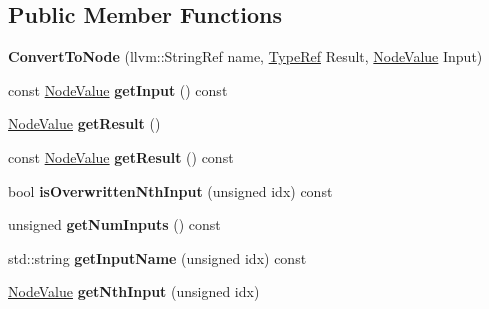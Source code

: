 \subsection*{Public Member Functions}
\begin{DoxyCompactItemize}
\item 
\mbox{\label{classglow_1_1_convert_to_node_a64149289fdfae59e8509afcecfbeafa6}} 
{\bfseries Convert\+To\+Node} (llvm\+::\+String\+Ref name, \hyperlink{structglow_1_1_type}{Type\+Ref} Result, \hyperlink{structglow_1_1_node_value}{Node\+Value} Input)
\item 
\mbox{\label{classglow_1_1_convert_to_node_a2052aec7043a840a1539697730d9e506}} 
const \hyperlink{structglow_1_1_node_value}{Node\+Value} {\bfseries get\+Input} () const
\item 
\mbox{\label{classglow_1_1_convert_to_node_aa44afaef4038dcfaf4f9dbc24b743ba8}} 
\hyperlink{structglow_1_1_node_value}{Node\+Value} {\bfseries get\+Result} ()
\item 
\mbox{\label{classglow_1_1_convert_to_node_aa1a10c07da1625f83ff7b3f1c1c23784}} 
const \hyperlink{structglow_1_1_node_value}{Node\+Value} {\bfseries get\+Result} () const
\item 
\mbox{\label{classglow_1_1_convert_to_node_abd5b138f50837a98913927ce60e65565}} 
bool {\bfseries is\+Overwritten\+Nth\+Input} (unsigned idx) const
\item 
\mbox{\label{classglow_1_1_convert_to_node_a3b2717b4a9d8b566a6c334a615dc047f}} 
unsigned {\bfseries get\+Num\+Inputs} () const
\item 
\mbox{\label{classglow_1_1_convert_to_node_a37973cf3efa7c514bd4a37782a6c70f7}} 
std\+::string {\bfseries get\+Input\+Name} (unsigned idx) const
\item 
\mbox{\label{classglow_1_1_convert_to_node_aa2ea850326fefda8681767144f0b7832}} 
\hyperlink{structglow_1_1_node_value}{Node\+Value} {\bfseries get\+Nth\+Input} (unsigned idx)
\item 

\end{DoxyCompactItemize}
